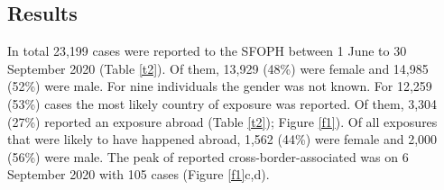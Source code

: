 \documentclass[10pt, a4paper, twoside]{article}
\begin{document}
\begin{multicols}{2}
\section{Results}
In total 23,199 cases were reported to the SFOPH between 1 June to 30 September 2020 (Table \ref{t2}). 
Of them, 13,929 (48\%) were female and 14,985 (52\%) were male.
For nine individuals the gender was not known.
For 12,259 (53\%) cases the most likely country of exposure was reported.
Of them, 3,304 (27\%) reported an exposure abroad (Table \ref{t2}); Figure \ref{f1}).
Of all exposures that were likely to have happened abroad, 1,562 (44\%) were female and 2,000 (56\%) were male.
The peak of reported cross-border-associated was on 6 September 2020 with 105 cases (Figure \ref{f1}c,d).

\end{multicols}
\begin{landscape}
\global\pdfpageattr\expandafter{\the\pdfpageattr/Rotate 90}
}
\end{landscape}
\end{document}
